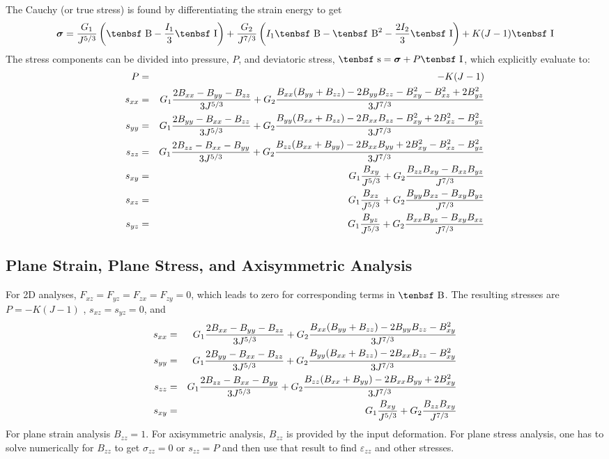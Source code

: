 \documentclass[11pt]{book}
\newcommand{\tens}[1]{\boldsymbol{\mathsf{#1}}}
\def\B{\hbox{\tenbsf B}}
\def\dev{\hbox{\tenbsf s}}
\def\e#1{\varepsilon_{#1}}
\def\I{\hbox{\tenbsf I}}
\def\s#1{\sigma_{#1}}
\begin{document}
The Cauchy (or true stress) is found by differentiating the strain energy to get
\begin{equation}
     \tens\sigma = {G_1\over J^{5/3}}\left(\B - {I_1\over3}\I\right)
                     +  {G_2\over J^{7/3}}\left(I_1\B - \B^2 - {2I_2\over3}\I\right)   + K(J-1)\I
\end{equation}
The stress components can be divided into pressure, $P$, and deviatoric stress, $\dev = \tens\sigma+P\I$, which explicitly evaluate to:
\begin{eqnarray}
      P & = & -K (J-1) \\
     s_{xx} & = & G_1{2B_{xx}-B_{yy}-B_{zz}\over 3J^{5/3}} + G_2{B_{xx}(B_{yy}+B_{zz})-2B_{yy}B_{zz}-B_{xy}^2-B_{xz}^2+2B_{yz}^2\over 3J^{7/3} }\\
      s_{yy} & = & G_1{2B_{yy}-B_{xx}-B_{zz}\over 3J^{5/3}} + G_2{B_{yy}(B_{xx}+B_{zz})-2B_{xx}B_{zz}-B_{xy}^2+2B_{xz}^2-B_{yz}^2\over 3J^{7/3} }\\
      s_{zz} & = &  G_1{2B_{zz}-B_{xx}-B_{yy}\over 3J^{5/3}} + G_2{B_{zz}(B_{xx}+B_{yy})-2B_{xx}B_{yy}+2B_{xy}^2-B_{xz}^2-B_{yz}^2\over 3J^{7/3} }\\
      s_{xy} & = &  G_1{B_{xy}\over J^{5/3}} + G_2{B_{zz}B_{xy}-B_{xz}B_{yz}\over J^{7/3}}\\
      s_{xz} & = & G_1{B_{xz}\over J^{5/3}} + G_2{B_{yy}B_{xz}-B_{xy}B_{yz}\over J^{7/3}}\\
      s_{yz} & = & G_1{B_{yz}\over J^{5/3}} + G_2{B_{xx}B_{yz}-B_{xy}B_{xz}\over J^{7/3}}
\end{eqnarray}

\subsection{Plane Strain, Plane Stress, and Axisymmetric Analysis}

For 2D analyses, $F_{xz}=F_{yz}=F_{zx}=F_{zy}=0$, which leads to zero for corresponding terms in $\B$. The resulting stresses are $ P = -K (J-1)$ , $s_{xz}=s_{yz}=0$, and
\begin{eqnarray}
      s_{xx} & = &  G_1{2B_{xx}-B_{yy}-B_{zz}\over 3J^{5/3}}  
                    + G_2{B_{xx}(B_{yy}+B_{zz})-2B_{yy}B_{zz}-B_{xy}^2\over 3J^{7/3} }\\
      s_{yy} & = &  G_1{2B_{yy}-B_{xx}-B_{zz}\over 3J^{5/3}}   
                     + G_2{B_{yy}(B_{xx}+B_{zz})-2B_{xx}B_{zz}-B_{xy}^2\over 3J^{7/3} }\\
      s_{zz} & = &   G_1{2B_{zz}-B_{xx}-B_{yy}\over 3J^{5/3}}   
                     + G_2{B_{zz}(B_{xx}+B_{yy})-2B_{xx}B_{yy}+2B_{xy}^2\over 3J^{7/3} }\\
      s_{xy} & = &  G_1{B_{xy}\over J^{5/3}} + G_2{B_{zz}B_{xy}\over J^{7/3}}
\end{eqnarray}
For plane strain analysis $B_{zz}=1$. For axisymmetric analysis, $B_{zz}$ is provided by the input deformation. For plane stress analysis, one has to solve numerically for $B_{zz}$ to get $\s{zz}=0$ or $s_{zz}=P$ and then use that result to find $\e{zz}$ and other stresses.
\end{document}
